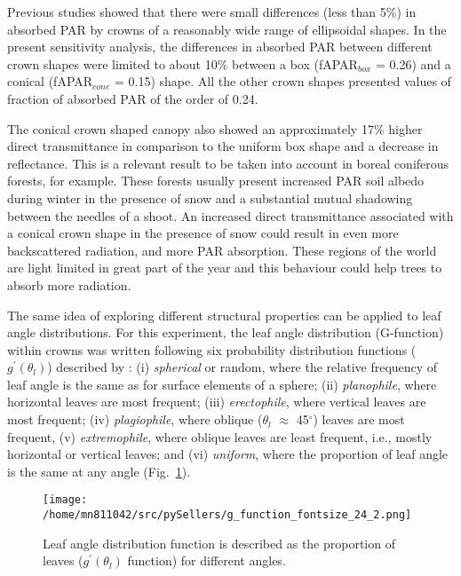 \documentclass[a4paper,11pt]{report}
\begin{document}
Previous studies \citep{Oker-Blom1982,Kuuluvainen1987} showed that there were small differences (less than 5\%) in absorbed PAR by crowns of a reasonably wide range of ellipsoidal shapes. In the present sensitivity analysis, the differences in absorbed PAR between different crown shapes were limited to about 10\% between a box (fAPAR$_{box}$ = 0.26) and a conical (fAPAR$_{cone}$ = 0.15) shape. All the other crown shapes presented values of fraction of absorbed PAR of the order of 0.24. 

The conical crown shaped canopy also showed an approximately 17\% higher direct transmittance in comparison to the uniform box shape and a decrease in reflectance. This is a relevant result to be taken into account in boreal coniferous forests, for example. These forests usually present increased PAR soil albedo during winter in the presence of snow and a substantial mutual shadowing between the needles of a shoot. An increased direct transmittance associated with a conical crown shape in the presence of snow could result in even more backscattered radiation, and more PAR absorption. These regions of the world are light limited in great part of the year and this behaviour could help trees to absorb more radiation.  
  
The same idea of exploring different structural properties can be applied to leaf angle distributions. For this experiment, the leaf angle distribution (G-function) within crowns was written following six probability distribution functions ($g^{\prime}(\theta_l)$)  described by \citet{deWit1965}: (i) \textit{spherical} or random, where the relative frequency of leaf angle is the same as for surface elements of a sphere; (ii) \textit{planophile}, where horizontal leaves are most frequent; (iii) \textit{erectophile}, where vertical leaves are most frequent; (iv) \textit{plagiophile}, where oblique ($\theta_l$ $\approx$ 45$^{\circ}$) leaves are most frequent, (v) \textit{extremophile}, where oblique leaves are least frequent, i.e., mostly horizontal or vertical leaves; and (vi) \textit{uniform}, where the proportion of leaf angle is the same at any angle (Fig.~\ref{f:g_function}). 

\begin{figure}[ht]
      	\centering
        \texttt{[image: /home/mn811042/src/pySellers/g\_function\_fontsize\_24\_2.png]}
        \caption{Leaf angle distribution function is described as the proportion of leaves ($g^{\prime}(\theta_l)$ function) for different angles.} 
\label{f:g_function}
\end{figure}
\end{document}
